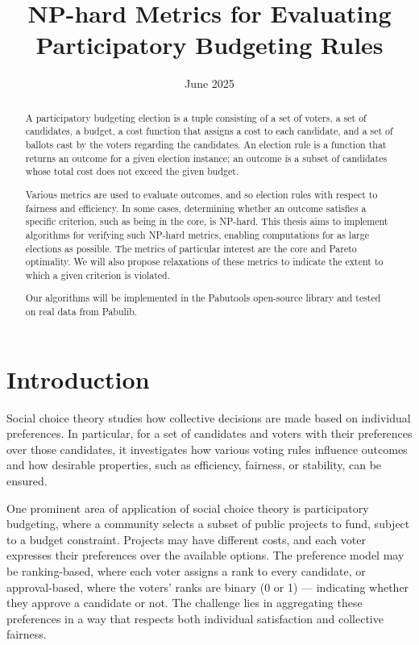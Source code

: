 \documentclass[magisterska,en]{pracamgr}
\title{NP-hard Metrics for Evaluating Participatory Budgeting Rules}
\date{June 2025}
\begin{document}
\maketitle

\begin{abstract}

A participatory budgeting election is a tuple consisting of a set of voters, a set of candidates, a budget, a cost function that assigns a cost to each candidate, and a set of ballots cast by the voters regarding the candidates. An election rule is a function that returns an outcome for a given election instance; an outcome is a subset of candidates whose total cost does not exceed the given budget.

Various metrics are used to evaluate outcomes, and so election rules with respect to fairness and efficiency. In some cases, determining whether an outcome satisfies a specific criterion, such as being in the core, is NP-hard. This thesis aims to implement algorithms for verifying such NP-hard metrics, enabling computations for as large elections as possible. The metrics of particular interest are the core and Pareto optimality. We will also propose relaxations of these metrics to indicate the extent to which a given criterion is violated.

Our algorithms will be implemented in the Pabutools open-source library and tested on real data from Pabulib.
\end{abstract}

\tableofcontents

\chapter*{Introduction}

Social choice theory studies how collective decisions are made based on individual preferences. In particular, for a set of candidates and voters with their preferences over those candidates, it investigates how various voting rules influence outcomes and how desirable properties, such as efficiency, fairness, or stability, can be ensured.

One prominent area of application of social choice theory is participatory budgeting, where a community selects a subset of public projects to fund, subject to a budget constraint. Projects may have different costs, and each voter expresses their preferences over the available options. The preference model may be ranking-based, where each voter assigns a rank to every candidate, or approval-based, where the voters’ ranks are binary (0 or 1) --- indicating whether they approve a candidate or not. The challenge lies in aggregating these preferences in a way that respects both individual satisfaction and collective fairness.
\end{document}
